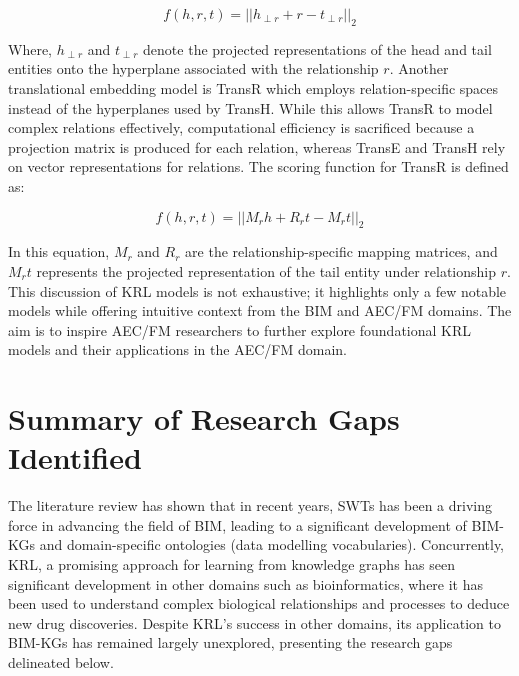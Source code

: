 \begin{equation}   
    f(h, r, t) = ||h_{\perp r} + r - t_{\perp r}||_2
\end{equation}

Where, $h_{\perp r}$ and $t_{\perp r}$ denote the projected representations of the head and tail entities onto the hyperplane associated with the relationship $r$.  Another translational embedding model is TransR \citep{Zhang2021TransRProjection} which employs relation-specific spaces instead of the hyperplanes used by TransH. While this allows TransR to model complex relations effectively, computational efficiency is sacrificed because a projection matrix is produced for each relation, whereas TransE and TransH rely on vector representations for relations. The scoring function for TransR is defined as:

\begin{equation}   
    f(h, r, t) = ||M_rh + R_rt - M_rt||_2
\end{equation}

In this equation, $M_r$ and $R_r$ are the relationship-specific mapping matrices, and $M_rt$ represents the projected representation of the tail entity under relationship $r$. This discussion of \ac{KRL} models is not exhaustive; it highlights only a few notable models while offering intuitive context from the \ac{BIM} and \ac{AEC/FM} domains. The aim is to inspire \ac{AEC/FM} researchers to further explore foundational \ac{KRL} models and their applications in the \ac{AEC/FM} domain.

\section{Summary of Research Gaps Identified}
\label{sec:research gaps}
The literature review has shown that in recent years, \acp{SWT} has been a driving force in advancing the field of \ac{BIM}, leading to a significant development of \acp{BIM-KG} and domain-specific ontologies (data modelling vocabularies). Concurrently, \ac{KRL}, a promising approach for learning from knowledge graphs has seen significant development in other domains such as bioinformatics, where it has been used to understand complex biological relationships and processes to deduce new drug discoveries. Despite \ac{KRL}'s success in other domains, its application to \acp{BIM-KG} has remained largely unexplored, presenting the research gaps delineated below.

